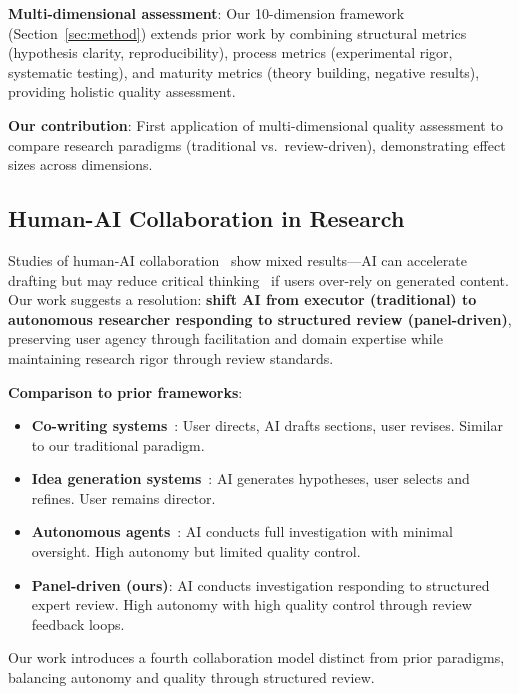 \textbf{Multi-dimensional assessment}: Our 10-dimension framework (Section~\ref{sec:method}) extends prior work by combining structural metrics (hypothesis clarity, reproducibility), process metrics (experimental rigor, systematic testing), and maturity metrics (theory building, negative results), providing holistic quality assessment.

\textbf{Our contribution}: First application of multi-dimensional quality assessment to compare research paradigms (traditional vs.\ review-driven), demonstrating effect sizes across dimensions.

\subsection{Human-AI Collaboration in Research}

Studies of human-AI collaboration~\cite{wang2024can, zhang2023coauthor} show mixed results---AI can accelerate drafting but may reduce critical thinking~\cite{dell2023navigating} if users over-rely on generated content. Our work suggests a resolution: \textbf{shift AI from executor (traditional) to autonomous researcher responding to structured review (panel-driven)}, preserving user agency through facilitation and domain expertise while maintaining research rigor through review standards.

\textbf{Comparison to prior frameworks}:

\begin{itemize}[leftmargin=*]
\item \textbf{Co-writing systems}~\cite{lee2022coauthor}: User directs, AI drafts sections, user revises. Similar to our traditional paradigm.

\item \textbf{Idea generation systems}~\cite{gero2024social}: AI generates hypotheses, user selects and refines. User remains director.

\item \textbf{Autonomous agents}~\cite{wang2024chemreasoner}: AI conducts full investigation with minimal oversight. High autonomy but limited quality control.

\item \textbf{Panel-driven (ours)}: AI conducts investigation responding to structured expert review. High autonomy with high quality control through review feedback loops.
\end{itemize}

Our work introduces a fourth collaboration model distinct from prior paradigms, balancing autonomy and quality through structured review.

